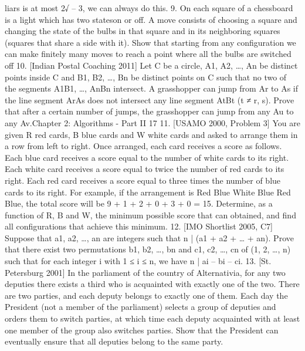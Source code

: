 \documentclass[a4paper,11pt]{book}
\begin{document}
liars is at most 2√ – 3, we can always do this.
9. On each square of a chessboard is a light which has two stateson or off. A move consists of choosing a square and changing
the state of the bulbs in that square and in its neighboring
squares (squares that share a side with it). Show that starting
from any configuration we can make finitely many moves to
reach a point where all the bulbs are switched off
10. [Indian Postal Coaching 2011]
Let C be a circle, A1, A2, …, An be distinct points inside C and B1,
B2, …, Bn be distinct points on C such that no two of the
segments A1B1, …, AnBn intersect. A grasshopper can jump from
Ar to As if the line segment ArAs does not intersect any line
segment AtBt (t ≠ r, s). Prove that after a certain number of
jumps, the grasshopper can jump from any Au to any Av.Chapter 2: Algorithms - Part II 17
11. [USAMO 2000, Problem 3]
You are given R red cards, B blue cards and W white cards and
asked to arrange them in a row from left to right. Once
arranged, each card receives a score as follows. Each blue card
receives a score equal to the number of white cards to its
right. Each white card receives a score equal to twice the
number of red cards to its right. Each red card receives a score
equal to three times the number of blue cards to its right. For
example, if the arrangement is Red Blue White Blue Red Blue,
the total score will be 9 + 1 + 2 + 0 + 3 + 0 = 15. Determine, as
a function of R, B and W, the minimum possible score that can
obtained, and find all configurations that achieve this
minimum.
12. [IMO Shortlist 2005, C7]
Suppose that a1, a2, …, an are integers such that n | (a1 + a2 + …
+ an). Prove that there exist two permutations b1, b2, …, bn and
c1, c2, …, cn of (1, 2, …, n) such that for each integer i with 1 ≤ i ≤
n, we have n | ai – bi – ci.
13. [St. Petersburg 2001]
In the parliament of the country of Alternativia, for any two
deputies there exists a third who is acquainted with exactly
one of the two. There are two parties, and each deputy
belongs to exactly one of them. Each day the President (not a
member of the parliament) selects a group of deputies and
orders them to switch parties, at which time each deputy
acquainted with at least one member of the group also
switches parties. Show that the President can eventually
ensure that all deputies belong to the same party.
\end{document}
